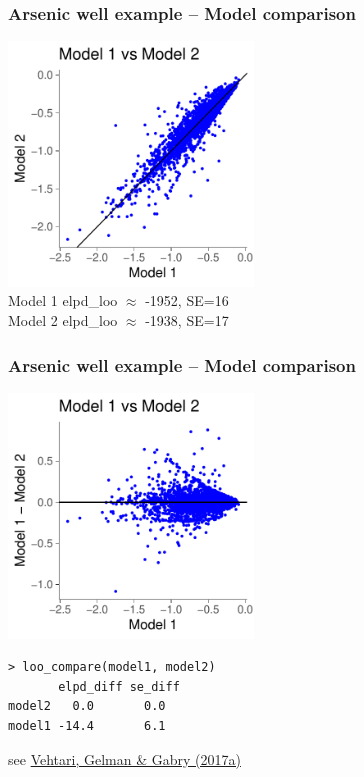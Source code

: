 \documentclass[10pt]{beamer}
\begin{document}
\begin{frame}

\frametitle{Arsenic well example -- Model comparison}

  {\includegraphics[width=6.5cm]{figs/arsenicelpdloo.pdf}}
  \\
  {Model 1 elpd\_loo $\approx$ -1952, SE=16\\
  Model 2 elpd\_loo $\approx$ -1938, SE=17}

\end{frame}



\begin{frame}[fragile]

\frametitle{Arsenic well example -- Model comparison}

  {\includegraphics[width=6.5cm]{figs/arsenicelpddiff.pdf}}
  \\
  {\scriptsize
\begin{lstlisting}
> loo_compare(model1, model2)
       elpd_diff se_diff
model2   0.0       0.0
model1 -14.4       6.1
\end{lstlisting}}
\vspace{-\baselineskip}
    {\scriptsize \hspace{6cm} see \href{http://link.springer.com/article/10.1007/s11222-016-9696-4}{Vehtari, Gelman \& Gabry (2017a)}}

\end{frame}
\end{document}
